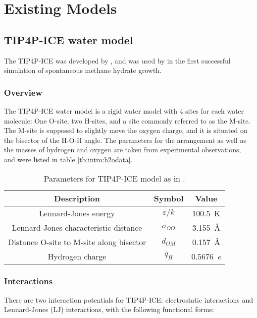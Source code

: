 \chapter{Existing Models}
%
\section{TIP4P-ICE water model}
The TIP4P-ICE was developed by \cite{Abascal2005}, and was used by \cite{Walsh2009} in the first successful simulation of spontaneous methane hydrate growth. 

\subsection{Overview}
The TIP4P-ICE water model is a rigid water model with 4 sites for each water molecule: One O-site, two H-sites, and a site commonly referred to as the M-site. The M-site is supposed to slightly move the oxygen charge, and it is situated on the bisector of the H-O-H angle. The parameters for the arrangement as well as the masses of hydrogen and oxygen are taken from experimental observations, and were listed in table \ref{tb:intro:h2odata}.

\begin{table}[h!tb]
\caption{Parameters for TIP4P-ICE model as in \cite{Abascal2005}.}
\begin{center}
\begin{tabular}{c|c|c}
Description & Symbol & Value \\ 
\hline
Lennard-Jones energy & $\varepsilon/k$ & \SI{100.5}{\kelvin} \\
Lennard-Jones characteristic distance & $\sigma_{OO}$ & \SI{3.155}{\angstrom} \\
Distance O-site to M-site along bisector & $d_{OM}$ & \SI{0.157}{\angstrom} \\
Hydrogen charge & $q_H$ & \SI{0.5676}{\elementarycharge} \\
\end{tabular}
\end{center}
\end{table}

\subsection{Interactions}
There are two interaction potentials for TIP4P-ICE: electrostatic interactions and Lennard-Jones (LJ) interactions, with the following functional forms:

